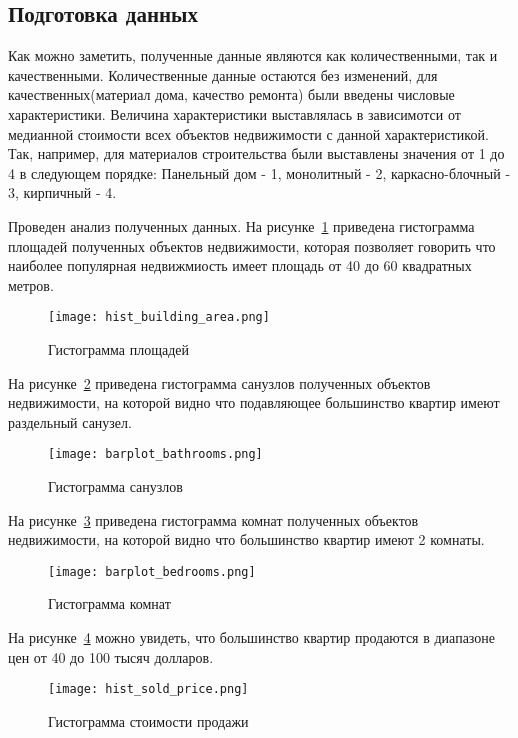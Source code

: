 \subsection{Подготовка данных}
\label{sec:experiment:data_preparation}



Как можно заметить, полученные данные являются как количественными, так и качественными. Количественные данные остаются
без изменений, для качественных(материал дома, качество ремонта) были введены числовые характеристики. 
Величина характеристики выставлялась в зависимотси от медианной стоимости всех объектов недвижимости с данной характеристикой.
Так, например, для материалов строительства были выставлены значения от 1 до 4 в следующем порядке: Панельный дом - 1,
монолитный - 2, каркасно-блочный - 3, кирпичный - 4.

Проведен анализ полученных данных. На рисунке~\ref{fig:experiment:hist_building_area} приведена гистограмма площадей
полученных объектов недвижимости, которая позволяет говорить что наиболее популярная недвижмиость имеет площадь от 40
до 60 квадратных метров.

\begin{figure}[!ht]
  \centering
  \texttt{[image: hist\_building\_area.png]} 
  \caption{Гистограмма площадей}
  \label{fig:experiment:hist_building_area}
\end{figure}

На рисунке~\ref{fig:experiment:barplot_bathrooms} приведена гистограмма санузлов
полученных объектов недвижимости, на которой видно что подавляющее большинство квартир имеют раздельный санузел.

\begin{figure}[!ht]
  \centering
  \texttt{[image: barplot\_bathrooms.png]} 
  \caption{Гистограмма санузлов}
  \label{fig:experiment:barplot_bathrooms}
\end{figure}

На рисунке~\ref{fig:experiment:barplot_bedrooms} приведена гистограмма комнат
полученных объектов недвижимости, на которой видно что большинство квартир имеют 2 комнаты.

\begin{figure}[!ht]
  \centering
  \texttt{[image: barplot\_bedrooms.png]} 
  \caption{Гистограмма комнат}
  \label{fig:experiment:barplot_bedrooms}
\end{figure}

На рисунке~\ref{fig:experiment:hist_sold_price} можно увидеть, что большинство квартир продаются в диапазоне
цен от 40 до 100 тысяч долларов.

\begin{figure}[!ht]
  \centering
  \texttt{[image: hist\_sold\_price.png]} 
  \caption{Гистограмма стоимости продажи}
  \label{fig:experiment:hist_sold_price}
\end{figure}
